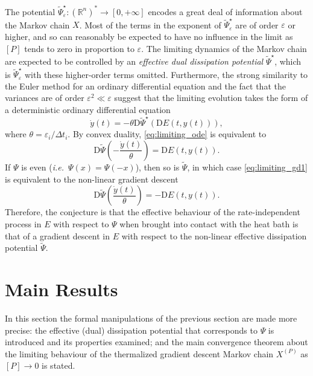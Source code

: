 \documentclass[reqno]{amsart}
\theoremstyle{definition}
\begin{document}
The potential ${\widetilde{\Psi}}_{\varepsilon}^{\star} \colon ({\mathbb{R}}^{n})^{\ast} \to [0, + \infty]$ encodes a great deal of information about the Markov chain $X$.  Most of the terms in the exponent of ${\widetilde{\Psi}}_{\varepsilon}^{\star}$ are of order ${\varepsilon}$ or higher, and so can reasonably be expected to have no influence in the limit as $[P]$ tends to zero in proportion to ${\varepsilon}$.  The limiting dynamics of the Markov chain are expected to be controlled by an \emph{effective dual dissipation potential} ${\widetilde{\Psi}}^{\star}$, which is ${\widetilde{\Psi}}_{\varepsilon}^{\star}$ with these higher-order terms omitted.  Furthermore, the strong similarity to the Euler method for an ordinary differential equation and the fact that the variances are of order ${\varepsilon}^{2} \ll {\varepsilon}$ suggest that the limiting evolution takes the form of a deterministic ordinary differential equation
\begin{equation}
	\label{eq:limiting_ode}
	\dot{y}(t) = - \theta {\mathrm{D}} {\widetilde{\Psi}}^{\star} ({\mathrm{D}} E(t, y(t))),
\end{equation}
where $\theta = {\varepsilon}_{i} / \Delta t_{i}$.  By convex duality, \eqref{eq:limiting_ode} is equivalent to
\begin{equation}
	\label{eq:limiting_gd1}
	{\mathrm{D}} {\widetilde{\Psi}} \left( - \frac{\dot{y}(t)}{\theta} \right) = {\mathrm{D}} E(t, y(t)).
\end{equation}
If $\Psi$ is even (\emph{i.e.}\ $\Psi(x) = \Psi(-x)$), then so is ${\widetilde{\Psi}}$, in which case \eqref{eq:limiting_gd1} is equivalent to the non-linear gradient descent
\begin{equation}
	\label{eq:limiting_gd2}
	{\mathrm{D}} {\widetilde{\Psi}} \left( \frac{\dot{y}(t)}{\theta} \right) = - {\mathrm{D}} E(t, y(t)).
\end{equation}
Therefore, the conjecture is that the effective behaviour of the rate-independent process in $E$ with respect to $\Psi$ when brought into contact with the heat bath is that of a gradient descent in $E$ with respect to the non-linear effective dissipation potential ${\widetilde{\Psi}}$.

\section{Main Results}
\label{sec:main}

In this section the formal manipulations of the previous section are made more precise:  the effective (dual) dissipation potential that corresponds to $\Psi$ is introduced and its properties examined;  and the main convergence theorem about the limiting behaviour of the thermalized gradient descent Markov chain $X^{(P)}$ as $[P] \to 0$ is stated.
\end{document}
